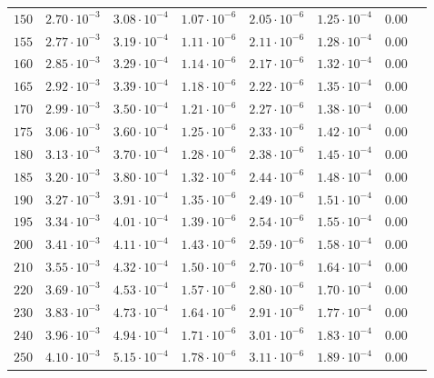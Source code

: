 \begin{table}
\begin{tabular}{lccccccc}
$150 $&$ 2.70\cdot 10^{-3} $&$ 3.08\cdot 10^{-4} $&$ 1.07\cdot 10^{-6} $&$ 2.05\cdot 10^{-6} $&$ 1.25\cdot 10^{-4} $&$ 0.00  $\\
$155 $&$ 2.77\cdot 10^{-3} $&$ 3.19\cdot 10^{-4} $&$ 1.11\cdot 10^{-6} $&$ 2.11\cdot 10^{-6} $&$ 1.28\cdot 10^{-4} $&$ 0.00  $\\
$160 $&$ 2.85\cdot 10^{-3} $&$ 3.29\cdot 10^{-4} $&$ 1.14\cdot 10^{-6} $&$ 2.17\cdot 10^{-6} $&$ 1.32\cdot 10^{-4} $&$ 0.00  $\\
$165 $&$ 2.92\cdot 10^{-3} $&$ 3.39\cdot 10^{-4} $&$ 1.18\cdot 10^{-6} $&$ 2.22\cdot 10^{-6} $&$ 1.35\cdot 10^{-4} $&$ 0.00  $\\
$170 $&$ 2.99\cdot 10^{-3} $&$ 3.50\cdot 10^{-4} $&$ 1.21\cdot 10^{-6} $&$ 2.27\cdot 10^{-6} $&$ 1.38\cdot 10^{-4} $&$ 0.00  $\\
$175 $&$ 3.06\cdot 10^{-3} $&$ 3.60\cdot 10^{-4} $&$ 1.25\cdot 10^{-6} $&$ 2.33\cdot 10^{-6} $&$ 1.42\cdot 10^{-4} $&$ 0.00  $\\
$180 $&$ 3.13\cdot 10^{-3} $&$ 3.70\cdot 10^{-4} $&$ 1.28\cdot 10^{-6} $&$ 2.38\cdot 10^{-6} $&$ 1.45\cdot 10^{-4} $&$ 0.00  $\\
$185 $&$ 3.20\cdot 10^{-3} $&$ 3.80\cdot 10^{-4} $&$ 1.32\cdot 10^{-6} $&$ 2.44\cdot 10^{-6} $&$ 1.48\cdot 10^{-4} $&$ 0.00  $\\
$190 $&$ 3.27\cdot 10^{-3} $&$ 3.91\cdot 10^{-4} $&$ 1.35\cdot 10^{-6} $&$ 2.49\cdot 10^{-6} $&$ 1.51\cdot 10^{-4} $&$ 0.00  $\\
$195 $&$ 3.34\cdot 10^{-3} $&$ 4.01\cdot 10^{-4} $&$ 1.39\cdot 10^{-6} $&$ 2.54\cdot 10^{-6} $&$ 1.55\cdot 10^{-4} $&$ 0.00  $\\
$200 $&$ 3.41\cdot 10^{-3} $&$ 4.11\cdot 10^{-4} $&$ 1.43\cdot 10^{-6} $&$ 2.59\cdot 10^{-6} $&$ 1.58\cdot 10^{-4} $&$ 0.00  $\\
$210 $&$ 3.55\cdot 10^{-3} $&$ 4.32\cdot 10^{-4} $&$ 1.50\cdot 10^{-6} $&$ 2.70\cdot 10^{-6} $&$ 1.64\cdot 10^{-4} $&$ 0.00  $\\
$220 $&$ 3.69\cdot 10^{-3} $&$ 4.53\cdot 10^{-4} $&$ 1.57\cdot 10^{-6} $&$ 2.80\cdot 10^{-6} $&$ 1.70\cdot 10^{-4} $&$ 0.00  $\\
$230 $&$ 3.83\cdot 10^{-3} $&$ 4.73\cdot 10^{-4} $&$ 1.64\cdot 10^{-6} $&$ 2.91\cdot 10^{-6} $&$ 1.77\cdot 10^{-4} $&$ 0.00  $\\
$240 $&$ 3.96\cdot 10^{-3} $&$ 4.94\cdot 10^{-4} $&$ 1.71\cdot 10^{-6} $&$ 3.01\cdot 10^{-6} $&$ 1.83\cdot 10^{-4} $&$ 0.00  $\\
$250 $&$ 4.10\cdot 10^{-3} $&$ 5.15\cdot 10^{-4} $&$ 1.78\cdot 10^{-6} $&$ 3.11\cdot 10^{-6} $&$ 1.89\cdot 10^{-4} $&$ 0.00  $\\

\end{tabular}
\end{table}
